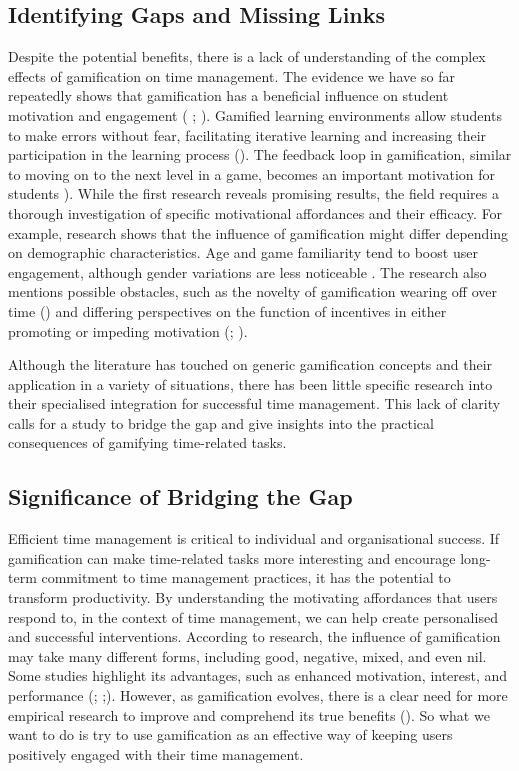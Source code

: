 \documentclass{l4proj}
\begin{document}
\subsection{Identifying Gaps and Missing Links}
Despite the potential benefits, there is a lack of understanding of the complex effects of gamification on time management. The evidence we have so far repeatedly shows that gamification has a beneficial influence on student motivation and engagement ( \cite{camilleri2017students}; \cite{kapp2012gamification}). Gamified learning environments allow students to make errors without fear, facilitating iterative learning and increasing their participation in the learning process (\cite{muntean2011raising}). The feedback loop in gamification, similar to moving on to the next level in a game, becomes an important motivation for students \cite{kapp2012gamification}). While the first research reveals promising results, the field requires a thorough investigation of specific motivational affordances and their efficacy. For example, research shows that the influence of gamification might differ depending on demographic characteristics. Age and game familiarity tend to boost user engagement, although gender variations are less noticeable  \cite{fanfarelli2015individual}. The research also mentions possible obstacles, such as the novelty of gamification wearing off over time (\cite{hamari2015working}) and differing perspectives on the function of incentives in either promoting or impeding motivation (\cite{lepper1973undermining}; \cite{ryan2000intrinsic}).


Although the literature has touched on generic gamification concepts and their application in a variety of situations, there has been little specific research into their specialised integration for successful time management. This lack of clarity calls for a study to bridge the gap and give insights into the practical consequences of gamifying time-related tasks.


\subsection{Significance of Bridging the Gap}
Efficient time management is critical to individual and organisational success. If gamification can make time-related tasks more interesting and encourage long-term commitment to time management practices, it has the potential to transform productivity. By understanding the motivating affordances that users respond to, in the context of time management, we can help create personalised and successful interventions. According to research, the influence of gamification may take many different forms, including good, negative, mixed, and even nil. Some studies highlight its advantages, such as enhanced motivation, interest, and performance (\cite{kim2021effects}; \cite{toda2017dark};). However, as gamification evolves, there is a clear need for more empirical research to improve and comprehend its true benefits (\cite{kapp2012gamification}). So what we want to do is try to use gamification as an effective way of keeping users positively engaged with their time management.
\end{document}
